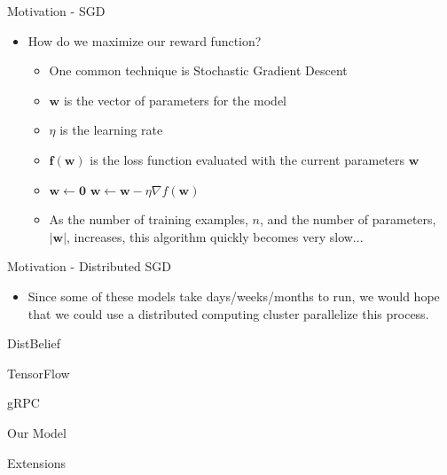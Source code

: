 \documentclass{beamer}
\begin{document}
\begin{frame}{Motivation - SGD}
\begin{itemize}
\item How do we maximize our reward function?
\begin{itemize}
\item One common technique is Stochastic Gradient Descent
\item $\mathbf w$ is the vector of parameters for the model
\item $\eta$ is the learning rate 
\item $\mathbf f(\mathbf w)$ is the loss function evaluated with the current parameters $\mathbf w$
\item 
\begin{algorithmic}
\State $\mathbf w \gets \mathbf 0$
    \State $\mathbf w \gets \mathbf w - \eta\nabla f(\mathbf w)$

	\EndFor
\EndWhile

\end{algorithmic}
\item As the number of training examples, $n$, and the number of parameters, $|\mathbf w|$, increases, this algorithm quickly becomes very slow...
\end{itemize}
\end{itemize}
\end{frame}

\begin{frame}{Motivation - Distributed SGD}
\begin{itemize}
\item Since some of these models take days/weeks/months to run, we would hope that we could use a distributed computing cluster parallelize this process.
\end{itemize}

\end{frame}

\begin{frame}{DistBelief}
\end{frame}

\begin{frame}{TensorFlow}

\end{frame}


\begin{frame}{gRPC}

\end{frame}

\begin{frame}{Our Model}

\end{frame}



\begin{frame}{Extensions}
  
\end{frame}
\end{document}
